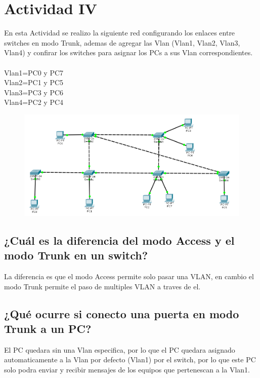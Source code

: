 \documentclass[spanish]{udpreport}
\begin{document}
\section{Actividad IV}
En esta Actividad se realizo la siguiente red configurando los enlaces entre switches en modo Trunk, ademas de agregar las Vlan (Vlan1, Vlan2, Vlan3, Vlan4)
y confirar los switches para asignar los PCs a sus Vlan correspondientes.\\\\
Vlan1=PC0 y PC7\\
Vlan2=PC1 y PC5\\
Vlan3=PC3 y PC6\\
Vlan4=PC2 y PC4\\
\begin{figure}[H]
\begin{center}
\includegraphics[scale=0.65]{images/VLAN.PNG}
\end{center}
\end{figure}

\subsection{¿Cuál es la diferencia del modo Access y el modo Trunk en un switch?}
La diferencia es que el modo Access permite solo pasar una VLAN, en cambio el modo Trunk permite el paso de multiples VLAN a traves de el.\\

\subsection{¿Qué ocurre si conecto una puerta en modo Trunk a un PC?}
El PC quedara sin una Vlan especifica, por lo que el PC quedara asignado automaticamente a la Vlan por defecto (Vlan1) por el switch, por lo que este PC solo podra enviar y recibir mensajes de los equipos que pertenescan a la Vlan1.
\end{document}
